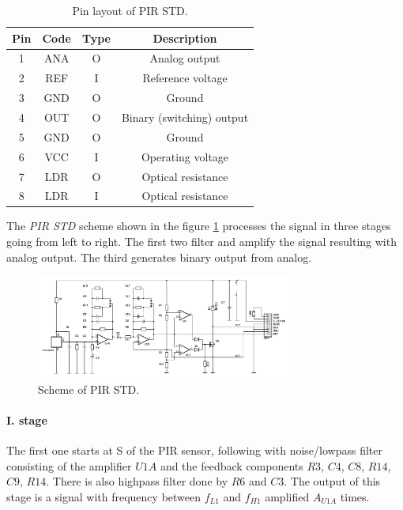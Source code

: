 \begin{table}[h!]
\begin{center}
\begin{tabular}{|c c | c | c |} \hline
\textbf{Pin} & \textbf{Code} & \textbf{Type} & \textbf{Description} \\ \hline
1 & ANA & O & Analog output \\ \hline
2 & REF & I & Reference voltage \\ \hline
3 & GND & O & Ground \\ \hline
4 & OUT & O & Binary (switching) output \\ \hline
5 & GND & O & Ground \\ \hline
6 & VCC & I & Operating voltage \\ \hline
7 & LDR & O & Optical resistance \\ \hline
8 & LDR & I & Optical resistance \\ \hline
\end{tabular}
\end{center}
\caption{Pin layout of PIR STD.\cite{PIROperationalManual}\label{fig:pirstdpin}}
\end{table}

The {\it PIR STD} scheme shown in the figure \ref{fig:pirstdscheme} processes the signal
in three stages going from left to right. The first two filter and amplify the signal
resulting with analog output. The third generates binary output from analog.

\begin{figure}[h!]
\begin{center}
\includegraphics[width=0.75\textwidth]{img/pirstd.png}
\caption{Scheme of PIR STD.\cite{PIROperationalManual}\label{fig:pirstdscheme}}
\end{center}
\end{figure}

\paragraph{I. stage}
The first one starts at S of the PIR sensor, following with noise/lowpass filter consisting
of the amplifier $U1A$ and the feedback components $R3$, $C4$, $C8$, $R14$, $C9$, $R14$.
There is also highpass filter done by $R6$ and $C3$. The output of this stage is a signal
with frequency between $f_{L1}$ and $f_{H1}$ amplified $A_{U1A}$ times.

